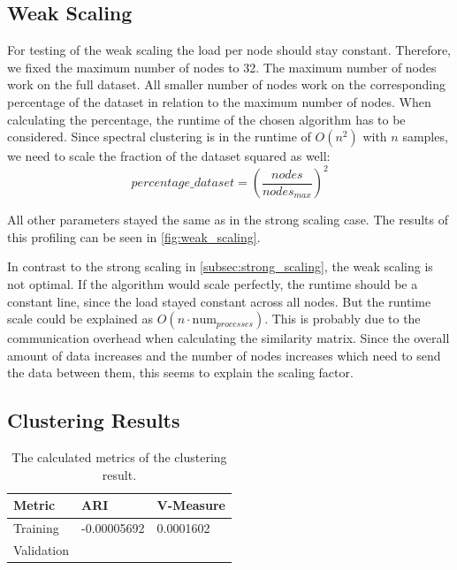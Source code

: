\subsection{Weak Scaling}
\label{subsec:weak_scaling}

For testing of the weak scaling the load per node should stay constant. Therefore, we fixed the
maximum number of nodes to 32.
The maximum number of nodes work on the full dataset. All smaller number of nodes work on the corresponding
percentage of the dataset in relation to the maximum number of nodes. When calculating the percentage, the runtime
of the chosen algorithm has to be considered. Since spectral clustering is in the runtime of \(O(n^2)\) with \(n\) samples,
we need to scale the fraction of the dataset squared as well:
\[percentage\_dataset = \left(\frac{nodes}{nodes_{max}}\right)^2\]

All other parameters stayed the same as in the strong scaling case.
The results of this profiling can be seen in \cref{fig:weak_scaling}.

In contrast to the strong scaling in \cref{subsec:strong_scaling}, the weak scaling is not optimal. If the algorithm would scale perfectly, the runtime should be a
constant line, since the load stayed constant across all nodes. But the runtime scale could be explained as \(O(n \cdot \text{num}_{processes})\).
This is probably due to the communication overhead when calculating the similarity matrix.
Since the overall amount of data increases and the number of nodes increases which need to send the data between them, this seems to explain the scaling factor.

\subsection{Clustering Results}
\label{subsec:clustering_results}

\begin{table}
    \centering
    \begin{tabular}{lll}
      \toprule
      Metric     &  ARI & V-Measure \\
      \midrule
      Training   &  -0.00005692  &  0.0001602     \\
      Validation &   & \\
      \bottomrule
    \end{tabular}
    \caption{The calculated metrics of the clustering result.}
    \label{tab:clustering_results}
  \end{table}

